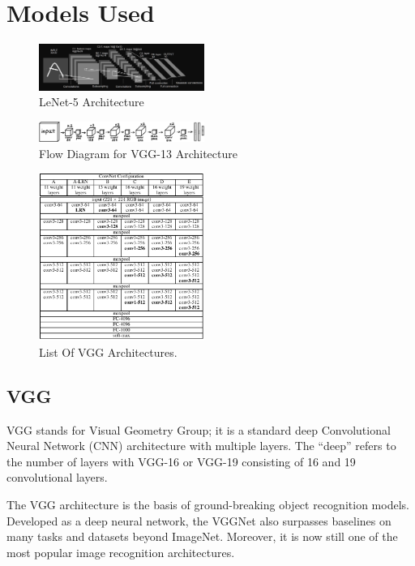 \section{Models Used}
\begin{figure}
    \centering
    \includegraphics[width=0.48\textwidth]{Images/lenet_arcj.png}
    \caption{LeNet-5 Architecture}
    \label{fig:lenet-arch}
\end{figure}
\begin{figure}
    \centering
    \includegraphics[width=0.48\textwidth]{Images/vgg-13-diag.png}
    \caption{Flow Diagram for VGG-13 Architecture}
    \label{fig:vgg-13-diag}
\end{figure}
\begin{figure}
    \centering
    \includegraphics[width=0.48\textwidth]{Images/vgg_list.png}
    \caption{List Of VGG Architectures.}
    \label{fig:vgg-list}
\end{figure}
\subsection{VGG}
VGG stands for Visual Geometry Group; it is a standard deep Convolutional Neural Network (CNN) architecture with multiple layers. The “deep” refers to the number of layers with VGG-16 or VGG-19 consisting of 16 and 19 convolutional layers.\par

The VGG architecture is the basis of ground-breaking object recognition models. Developed as a deep neural network, the VGGNet also surpasses baselines on many tasks and datasets beyond ImageNet. Moreover, it is now still one of the most popular image recognition architectures.\par

